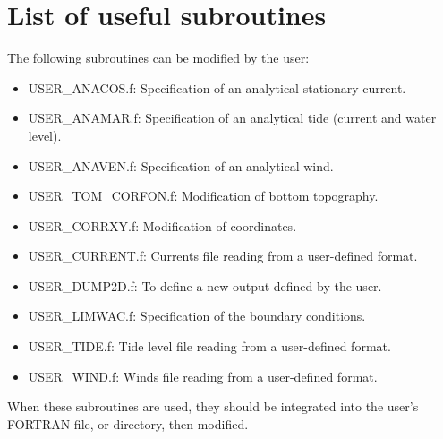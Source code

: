 \section{List of useful subroutines}
\label{se:usefulsub}

 The following subroutines can be modified by the user:

\begin{itemize}
\item  USER\_ANACOS.f:  Specification of an analytical stationary current.

\item  USER\_ANAMAR.f:  Specification of an analytical tide (current and water level).

\item  USER\_ANAVEN.f:  Specification of an analytical wind.

\item  USER\_TOM\_CORFON.f:  Modification of bottom topography.

\item  USER\_CORRXY.f:  Modification of coordinates.

\item  USER\_CURRENT.f:  Currents file reading from a user-defined format.

\item  USER\_DUMP2D.f: To define a new output defined by the user. 

\item  USER\_LIMWAC.f:  Specification of the boundary conditions.

\item  USER\_TIDE.f:  Tide level file reading from a user-defined format.

\item  USER\_WIND.f:  Winds file reading from a user-defined format.
\end{itemize}

 When these subroutines are used, they should be integrated into the user's FORTRAN file, or directory, then modified.


